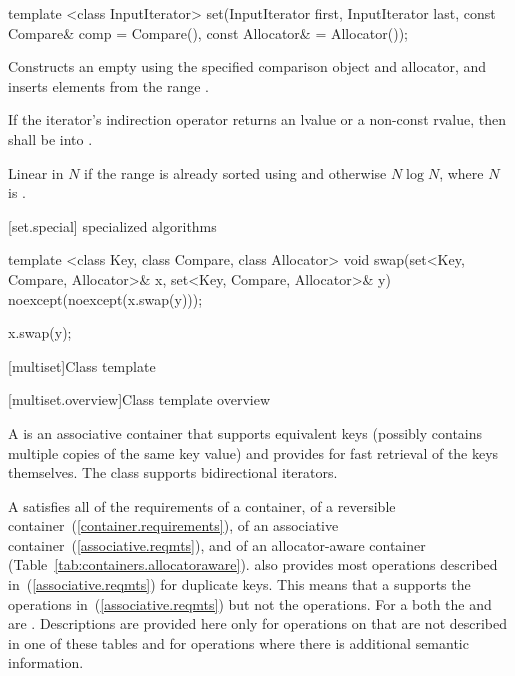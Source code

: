 %
%
\begin{itemdecl}
template <class InputIterator>
  set(InputIterator first, InputIterator last,
      const Compare& comp = Compare(), const Allocator& = Allocator());
\end{itemdecl}

\begin{itemdescr}
\pnum
\effects
Constructs an empty
using the specified comparison object and allocator,
and inserts elements from the range
.

\pnum
\requires If the iterator's indirection operator returns an lvalue or a
non-const rvalue, then  shall be
 into .

\pnum
\complexity
Linear in $N$ if the range
is already sorted using 
and otherwise $N \log{N}$,
where $N$ is
.
\end{itemdescr}

[set.special]{ specialized algorithms}

%
%
\begin{itemdecl}
template <class Key, class Compare, class Allocator>
  void swap(set<Key, Compare, Allocator>& x,
            set<Key, Compare, Allocator>& y)
    noexcept(noexcept(x.swap(y)));
\end{itemdecl}

\begin{itemdescr}
\pnum
\effects
\begin{codeblock}
x.swap(y);
\end{codeblock}
\end{itemdescr}

[multiset]{Class template }

[multiset.overview]{Class template  overview}

\pnum
{}%
A
is an associative container that supports equivalent keys (possibly contains multiple copies of
the same key value) and provides for fast retrieval of the keys themselves.
The
 class
supports bidirectional iterators.

\pnum
A  satisfies all of the requirements of a container, of a
reversible container~(\ref{container.requirements}), of an associative
container~(\ref{associative.reqmts}), and of an allocator-aware container
(Table~\ref{tab:containers.allocatoraware}).
also provides most operations described in~(\ref{associative.reqmts})
for duplicate keys.
This means that a
supports the
operations in~(\ref{associative.reqmts})
but not the
operations.
For a
both the
and
are
.
Descriptions are provided here only for operations on
that are not described in one of these tables
and for operations where there is additional semantic information.

